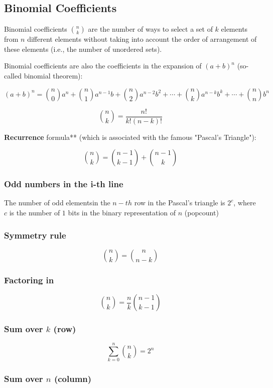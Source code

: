 \subsection{Binomial Coefficients}

Binomial coefficients $\binom n k$ are the number of ways to select a set of $k$ elements from $n$ different elements without taking into account the order of arrangement of these elements (i.e., the number of unordered sets).

Binomial coefficients are also the coefficients in the expansion of $(a + b) ^ n$ (so-called binomial theorem):

$$ (a+b)^n = \binom n 0 a^n + \binom n 1 a^{n-1} b + \binom n 2 a^{n-2} b^2 + \cdots + \binom n k a^{n-k} b^k + \cdots + \binom n n b^n $$

$$ \binom n k = \frac {n!} {k!(n-k)!} $$

\textbf{Recurrence} formula** (which is associated with the famous "Pascal's Triangle"):

$$ \binom n k = \binom {n-1} {k-1} + \binom {n-1} k $$

\subsubsection{Odd numbers in the i-th line}


The number of odd elementsin the $n-th$ row in the Pascal's triangle is $2^{c}$, where $c$ is the number of $1$ bits in the binary representation of $n$ (popcount)

\subsubsection{Symmetry rule}

    \[ \binom n k = \binom n {n-k} \]

\subsubsection{Factoring in}

    \[ \binom n k = \frac n k \binom {n-1} {k-1} \]


\subsubsection{Sum over $k$ (row)}

    \[ \sum_{k = 0}^n \binom n k = 2 ^ n \]

\subsubsection{Sum over $n$ (column)}


